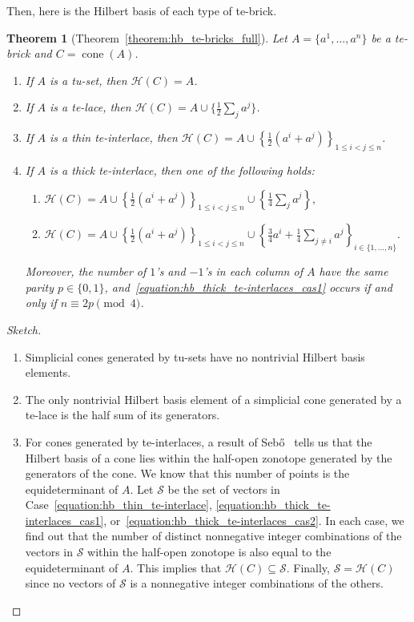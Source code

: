 \documentclass[11pt,a4paper]{amsart}
\renewcommand*{\leq}{\leqslant}
\theoremstyle{plain}
\newtheorem{theorem}{Theorem}[section]%
\theoremstyle{definition}
\newcommand{\cal}[1]{\mathcal{#1}}
\DeclareMathOperator{\cone}{cone}
\renewcommand{\cal}[1]{\mathcal{#1}}
\begin{document}
	Then, here is the Hilbert basis of each type of te-brick.
	\begin{theorem}[Theorem~\ref{theorem:hb_te-bricks_full}]\label{theorem:hb_te-bricks}
		Let $A = \{a^1,\ldots,a^n\}$ be a te-brick and $C = \cone (A)$.	
		\begin{enumerate}[label=\arabic*., ref=\arabic*.]
			\item If $A$ is a tu-set, then $\cal H(C)= A$.\label{equation:hb_tu-set}
			\item If $A$ is a te-lace, then $\cal H(C)= A\cup\{\frac{1}{2}\sum_j a^j\}$.\label{equation:hb_te-lace}
			\item If $A$ is a thin te-interlace, then $\cal H(C) = A\cup \left\{\frac{1}{2} (a^i + a^j)\right\}_{1\leq i<j\leq n}$.\label{equation:hb_thin_te-interlace}
			\item If $A$ is a thick te-interlace, then one of the following holds: \label{equation:hb_thick_te-interlace}
			\begin{enumerate}[label=\alph*., ref=\theenumi\alph*]
				\item $\cal H(C) = A\cup \left\{\frac{1}{2} (a^i + a^j)\right\}_{1\leq i< j\leq n}\cup\left\{\frac{1}{4}\sum_{j} a^j\right\},$ \label{equation:hb_thick_te-interlaces_cas1}
				\item $\cal H(C) = A\cup\left\{\frac{1}{2} (a^i + a^j)\right\}_{1\leq i< j\leq n}\cup\left\{\frac{3}{4}a^i+\frac{1}{4}\sum_{j\neq i} a^j\right\}_{i\in\{1,\ldots,n\}}.$ \label{equation:hb_thick_te-interlaces_cas2}
			\end{enumerate}
			Moreover, the number of $1$'s and $-1$'s in each column of $A$ have the same parity $p\in\{0,1\}$, and~\ref{equation:hb_thick_te-interlaces_cas1} occurs if and only if $n\equiv 2p \pmod{4}$.
		\end{enumerate}
	\end{theorem}
	\begin{proof}[Sketch]~
		\begin{enumerate}
			\item[{\em 1.}] Simplicial cones generated by tu-sets have no nontrivial Hilbert basis elements.
			\item[{\em 2.}] The only nontrivial Hilbert basis element of a simplicial cone generated by a te-lace is the half sum of its generators.
			\item[{\em 3-4.}] For cones generated by te-interlaces, a result of Seb\H o~\cite{Sebo_1990} tells us that the Hilbert basis of a cone lies within the half-open zonotope generated by the generators of the cone.
			We know that this number of points is the equideterminant of $A$. 
			Let $\cal S$ be the set of vectors in Case~\ref{equation:hb_thin_te-interlace}, \ref{equation:hb_thick_te-interlaces_cas1}, or~\ref{equation:hb_thick_te-interlaces_cas2}.
			In each case, we find out that the number of distinct nonnegative integer combinations of the vectors in $\cal S$ within the half-open zonotope is also equal to the equideterminant of $A$.
			This implies that $\cal{H}(C)\subseteq\cal S$.
			Finally, $\cal S=\cal H(C)$ since no vectors of $\cal S$ is a nonnegative integer combinations of the others.
		\end{enumerate}
		\end{proof}
	
\end{document}
